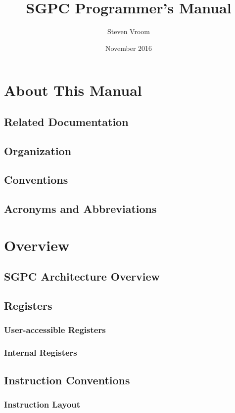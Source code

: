 \documentclass[twoside,a4paper]{memoir}
\begin{document}
\title{SGPC Programmer's Manual}
\author{Steven Vroom}
\date{November 2016}
\maketitle
\cleardoublepage
\setcounter{tocdepth}{3}
\tableofcontents
\cleardoublepage

\chapter*{About This Manual}
\section*{Related Documentation}
\section*{Organization}
\section*{Conventions}
\section*{Acronyms and Abbreviations}

\mainmatter
\chapter{Overview}
\section{SGPC Architecture Overview}
\section{Registers}
\subsection{User-accessible Registers}
\subsection{Internal Registers}
\section{Instruction Conventions}
\subsection{Instruction Layout}
\end{document}
